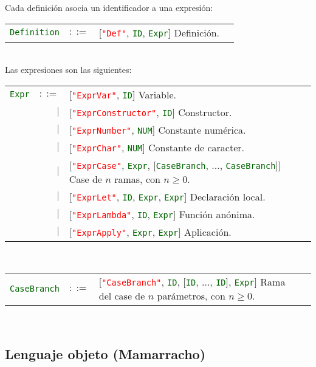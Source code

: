 \documentclass{article}
\newcommand{\mamarracho}{\textsf{Mamarracho}\xspace}
\newcommand{\ALT}{
  \\ & $\mid$ &
}
\newcommand{\type}[1]{\textcolor{darkgreen}{\texttt{#1}}}
\newcommand{\datadecl}[2]{\noindent
  \begin{tabularx}{\textwidth}{lrp{13cm}r}
  #1 & $::=$ & #2
  \end{tabularx}\\
}
\newcommand{\astkw}[1]{\texttt{\textcolor{red}{"#1"}}}
\begin{document}
\noindent Cada definición asocia un identificador a una expresión: \\
\datadecl{\type{Definition}}{
[\astkw{Def}, \type{ID}, \type{Expr}]
\hfill {\small Definición.}
}

\noindent Las expresiones son las siguientes: \\
\datadecl{\type{Expr}}{
[\astkw{ExprVar}, \type{ID}]
  \hfill {\small Variable.}
\ALT
[\astkw{ExprConstructor}, \type{ID}]
  \hfill {\small Constructor.}
\ALT
[\astkw{ExprNumber}, \type{NUM}]
  \hfill {\small Constante numérica.}
\ALT
[\astkw{ExprChar}, \type{NUM}]
  \hfill {\small Constante de caracter.}
\ALT
[\astkw{ExprCase}, \type{Expr}, [\type{CaseBranch}, $\hdots$, \type{CaseBranch}]]
  \hfill {\small Case de $n$ ramas, con $n \geq 0$.}
\ALT
[\astkw{ExprLet}, \type{ID}, \type{Expr}, \type{Expr}]
  \hfill {\small Declaración local.}
\ALT
[\astkw{ExprLambda}, \type{ID}, \type{Expr}]
  \hfill {\small Función anónima.}
\ALT
[\astkw{ExprApply}, \type{Expr}, \type{Expr}]
  \hfill {\small Aplicación.}
}
\medskip

\datadecl{\type{CaseBranch}}{
  [\astkw{CaseBranch}, \type{ID}, [\type{ID}, $\hdots$, \type{ID}], \type{Expr}]
  \hfill {\small Rama del case de $n$ parámetros, con $n \geq 0$.}
}

\subsection{Lenguaje objeto (\mamarracho)}
\end{document}
